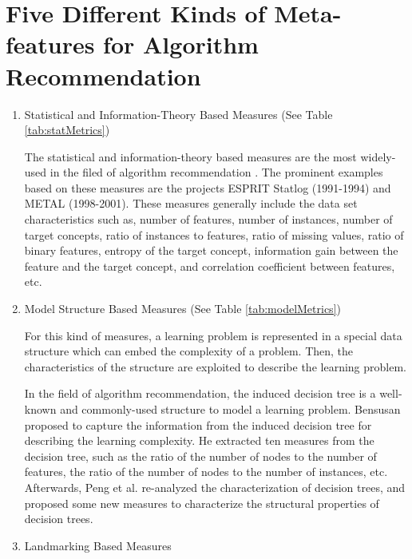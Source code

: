 \documentclass[acmsmall]{acmart}
\begin{document}

\section{Five Different Kinds of Meta-features for Algorithm Recommendation}\label{appendix:metaFeature}

\begin{enumerate}
	\item {Statistical and Information-Theory Based Measures} (See Table \ref{tab:statMetrics})
	
	The statistical and information-theory based measures are the most
	widely-used in the filed of algorithm recommendation
	\cite{brazdil2003ranking,king1995statlog,sohn1999meta,Henery1995methods,aha1992generalizing}.
	The prominent examples based on these measures are the projects
	ESPRIT Statlog (1991-1994) and METAL (1998-2001). These measures
	generally include the data set characteristics such as, number of
	features, number of instances, number of target concepts, ratio of
	instances to features, ratio of missing values, ratio of binary
	features, entropy of the target concept, information gain between
	the feature and the target concept, and correlation coefficient
	between features, etc.
	
	\item {Model Structure Based Measures} (See Table \ref{tab:modelMetrics})
	
	For this kind of measures, a learning problem is represented in a
	special data structure which can embed the complexity of a problem.
	Then, the characteristics of the structure are exploited to describe
	the learning problem.
	
	\quad In the field of algorithm recommendation, the induced decision
	tree is a well-known and commonly-used structure to model a learning
	problem. Bensusan \citeyear{Bensusan1998god} proposed to capture the
	information from the induced decision tree for describing the
	learning complexity. He extracted ten measures from the decision
	tree, such as the ratio of the number of nodes to the number of
	features, the ratio of the number of nodes to the number of
	instances, etc. Afterwards, Peng et al. \citeyear{peng2002improved}
	re-analyzed the characterization of decision trees, and proposed
	some new measures to characterize the structural properties of
	decision trees.
	
	\item {Landmarking Based Measures}
	

\end{enumerate}
\end{document}
